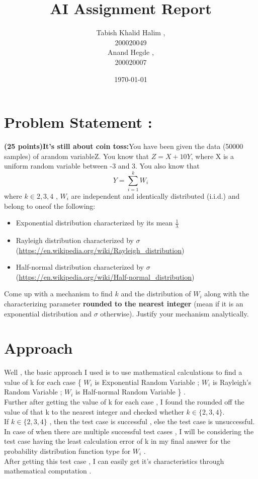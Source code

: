 \documentclass{article}
\title{AI Assignment Report}
\date{\today}
\author{Tabish Khalid Halim , \\ 200020049 \\ Anand Hegde , \\ 200020007}
\affil{Department of Computer Science, IIT Dharwad}
\begin{document}
\maketitle
{}
\newpage
\tableofcontents

\newpage
{}
\section*{Problem Statement :}
\textbf{(25 points)It’s still about coin toss:}You have been given the data (50000 samples) of arandom  variableZ.   You  know  that $Z=X+ 10Y$,  where X is a uniform  random  variable between -3 and 3.  You also know that 
$$ Y = \sum_{i = 1}^{k} W_i $$
where $ k \in {2,3,4}$ , $W_i$ are independent and identically distributed (i.i.d.)  and belong to oneof the following:
\begin{itemize}
    \item Exponential distribution characterized by its mean $ \frac{1}{\lambda} $
    \item Rayleigh distribution characterized by $\sigma$ \\ (\url{https://en.wikipedia.org/wiki/Rayleigh_distribution})
    \item Half-normal distribution characterized by $\sigma$ \\ (\url{https://en.wikipedia.org/wiki/Half-normal_distribution})
\end{itemize}    
Come up with a mechanism to find $k$ and the distribution of $W_i$ along with the characterizing parameter \textbf{rounded to the nearest integer} (mean if it is an exponential distribution and $\sigma$ otherwise).  Justify your mechanism analytically.
\vspace{20pt}
\section{Approach}
Well , the basic approach I used is to use mathematical calculations to find a value of k for each case \{ $W_i$ is Exponential Random Variable ; $W_i$ is Rayleigh's Random Variable ; $W_i$ is Half-normal Random Variable \} .
\vspace{10pt}
\\
Further after getting the value of k for each case , I found the rounded off the value of that k to the nearest integer and checked whether $k \in \{2,3,4\} $.
\vspace{10pt}
\\If $k \in \{ 2,3,4\}  $ , then the {\color{cyan} test case} is {\color{green}successful} , else the {\color{cyan} test case} is {\color{red}unsuccessful}.
\vspace{10pt}
\\In case of when there are multiple {\color{green}successful} test cases , I will be considering the test case having the least calculation error of k 
in my final answer for the probability distribution function type for $W_i$ .
\vspace{10pt}
\\After getting this test case , I can easily get it's characteristics through mathematical computation .
\newpage
\end{document}
